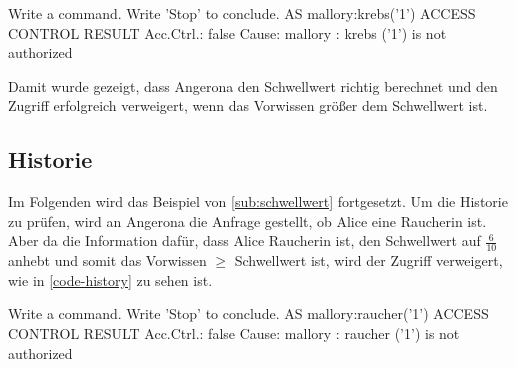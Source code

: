 \documentclass[german,version-2020-11]{uzl-thesis}
\begin{document}
\begin{Pseudocode}[caption={Angerona Ergebnis für Schwellwert=$\frac{34}{80}$}, label={code-thresholdNoAccess}]
Write a command. Write 'Stop' to conclude.
AS mallory:krebs('1')
ACCESS CONTROL RESULT
	Acc.Ctrl.: false Cause: mallory : krebs ('1') is not authorized
\end{Pseudocode}

Damit wurde gezeigt, dass Angerona den Schwellwert richtig berechnet und den Zugriff erfolgreich verweigert, wenn das Vorwissen größer dem Schwellwert ist.

\subsection{Historie}
Im Folgenden wird das Beispiel von \cref{sub:schwellwert} fortgesetzt. Um die Historie zu prüfen, wird an Angerona die Anfrage gestellt, ob Alice eine Raucherin ist. Aber da die Information dafür, dass Alice Raucherin ist, den Schwellwert auf $\frac{6}{10}$ anhebt und somit das Vorwissen $\geq$ Schwellwert ist, wird der Zugriff verweigert, wie in \autoref{code-history} zu sehen ist. 

\begin{Pseudocode}[caption={Angerona Ergebnis für die Abfrage, ob Alice Raucherin ist}, label={code-history}]
Write a command. Write 'Stop' to conclude.
AS mallory:raucher('1')
ACCESS CONTROL RESULT
	Acc.Ctrl.: false Cause: mallory : raucher ('1') is not authorized
\end{Pseudocode}
\end{document}
